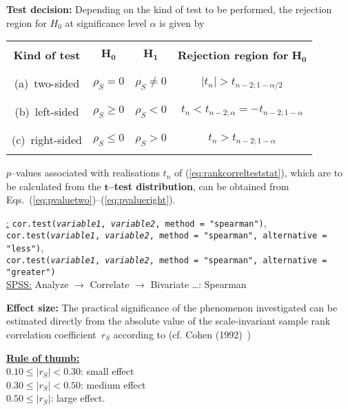 \medskip
\noindent
\textbf{Test decision:} Depending on the kind of test to be 
performed, the rejection region for $H_{0}$ at significance level 
$\alpha$ is given by
%
\begin{center}
\begin{tabular}[h]{c|c|c|c}
 & & & \\
\textbf{Kind of test} & $\boldsymbol{H_{0}}$ &
$\boldsymbol{H_{1}}$ &
\textbf{Rejection region for} $\boldsymbol{H_{0}}$ \\
 & & & \\
\hline
 & & & \\
(a)~two-sided & $\rho_{S}=0$ & $\rho_{S} \neq 0$ &
$|t_{n}|>t_{n-2;1-\alpha/2}$ \\
 & & & \\
\hline
 & & & \\
(b)~left-sided & $\rho_{S} \geq 0$ & $\rho_{S}<0$ &
$t_{n}<t_{n-2;\alpha}=-t_{n-2;1-\alpha}$ \\
 & & & \\
\hline
 & & & \\
(c)~right-sided & $\rho_{S} \leq 0$ & $\rho_{S}>0$ &
$t_{n}>t_{n-2;1-\alpha}$ \\
 & & &
\end{tabular}
\end{center}
%
$p$--values associated with realisations $t_{n}$ of 
(\ref{eq:rankcorrelteststat}), which are to be calculated from the
$\boldsymbol{t}$\textbf{--test distribution}, can be obtained from 
Eqs.~(\ref{eq:pvaluetwo})--(\ref{eq:pvalueright}).

\medskip
\noindent
\underline{\R:} \texttt{cor.test(\textit{variable1},
\textit{variable2}, method = "spearman")}, \\
\texttt{cor.test(\textit{variable1}, \textit{variable2}, 
method = "spearman", alternative = "less")}, \\
\texttt{cor.test(\textit{variable1}, \textit{variable2}, 
method = "spearman", alternative = "greater")} \\
\underline{SPSS:} Analyze $\rightarrow$ Correlate
$\rightarrow$ Bivariate \ldots: Spearman

\medskip
\noindent
\textbf{Effect size:} The practical significance of the phenomenon investigated can be estimated directly from the absolute value of
the scale-invariant sample rank correlation coefficient~$r_{S}$
according to (cf. Cohen (1992)~)

\medskip
\noindent
\underline{\textbf{Rule of thumb:}}\\
$0.10 \leq |r_{S}| < 0.30$: small effect\\
$0.30 \leq |r_{S}| < 0.50$: medium effect\\
$0.50 \leq |r_{S}|$: large effect.



